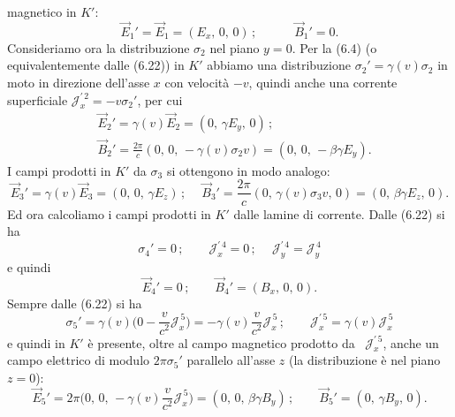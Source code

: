 magnetico in $K'$:
\begin{equation}
  \vec E_1'=\vec E_1=(E_x,\,0,\,0)\,;\qquad\quad\vec B_1'=0.
  \tag{6.26}
\end{equation}
Consideriamo ora la distribuzione $\sigma_2$ nel piano $y=0$. Per la (6.4)
\big(o equivalentemente dalle (6.22)\big) in $K'$ abbiamo una distribuzione
$\sigma_2'=\gamma(v)\sigma_2$ in moto in direzione dell'asse $x$ con velocit\`a
$-v$, quindi anche una corrente superficiale
$\mathcal J_x^{\prime\,2}=-v\sigma_2'$, per cui
\begin{equation}
  \begin{aligned}
    &\vec E_2'=\gamma(v)\vec E_2=(0,\,\gamma E_y,\,0)\,;\\
    &\vec B_2'=\frac{2\pi}{c}(0,\,0,\,-\gamma(v)\sigma_2v)
    =(0,\,0,\,-\beta\gamma E_y).
  \end{aligned}
  \tag{6.27}
\end{equation}
I campi prodotti in $K'$ da $\sigma_3$ si ottengono in modo analogo:
\begin{equation}
  \vec E_3'=\gamma(v)\vec E_3=(0,\,0,\,\gamma E_z)\,;
  \quad\ \vec B_3'=\frac{2\pi}{c}(0,\,\gamma(v)\sigma_3v,\,0)
  =(0,\,\beta\gamma E_z,\,0).
  \tag{6.28}
\end{equation}
Ed ora calcoliamo i campi prodotti in $K'$ dalle lamine di corrente. Dalle
(6.22) si ha
\begin{equation}
  \sigma_4'=0\,;\qquad\mathcal J_x^{\prime\,4}=0\,;
  \quad\ \mathcal J_y^{\prime\,4}=\mathcal J_y^{\,4}
  \tag{6.29}
\end{equation}
e quindi
\begin{equation}
  \vec E_4'=0\,;\qquad\vec B_4'=(B_x,\,0,\,0).
  \tag{6.30}
\end{equation}
Sempre dalle (6.22) si ha
\begin{equation}
  \sigma_5'=\gamma(v)\big(0-\frac{v}{c^2}\mathcal J_x^{\,5}\big)
  =-\gamma(v)\frac{v}{c^2}\mathcal J_x^{\,5}\,;
  \qquad\mathcal J_x^{\prime\,5}=\gamma(v)\mathcal J_x^{\,5}
  \tag{6.31}
\end{equation}
e quindi in $K'$ \`e presente, oltre al campo magnetico prodotto da
\ $\mathcal J_x^{\prime\,5}$, anche un campo elettrico di modulo $2\pi\sigma_5'$
parallelo all'asse $z$ (la distribuzione \`e nel piano $z=0$):
\begin{equation}
  \vec E_5'=2\pi\big(0,\,0,\,-\gamma(v)\frac{v}{c^2}\mathcal J_x^{\,5}\big)
  =(0,\,0,\,\beta\gamma B_y)\,;\qquad\vec B_5'=(0,\,\gamma B_y,\,0).
  \tag{6.32}
\end{equation}
